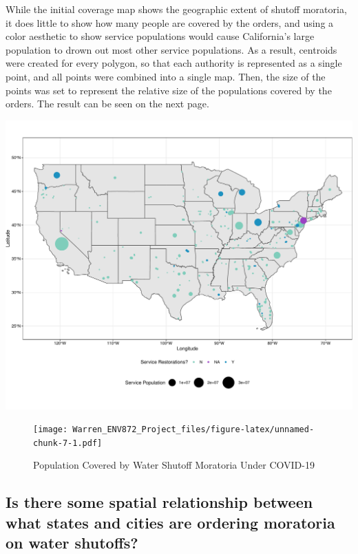 \documentclass[
  12pt,
]{article}
\begin{document}
While the initial coverage map shows the geographic extent of shutoff
moratoria, it does little to show how many people are covered by the
orders, and using a color aesthetic to show service populations would
cause California's large population to drown out most other service
populations. As a result, centroids were created for every polygon, so
that each authority is represented as a single point, and all points
were combined into a single map. Then, the size of the points was set to
represent the relative size of the populations covered by the orders.
The result can be seen on the next page.

\includegraphics{Warren_ENV872_Project_files/figure-latex/unnamed-chunk-6-1.pdf}

\begin{figure}
\centering
\texttt{[image: Warren\_ENV872\_Project\_files/figure-latex/unnamed-chunk-7-1.pdf]}
\caption{Population Covered by Water Shutoff Moratoria Under COVID-19}
\end{figure}

\newpage

\hypertarget{is-there-some-spatial-relationship-between-what-states-and-cities-are-ordering-moratoria-on-water-shutoffs}{%
\subsection{Is there some spatial relationship between what states and
cities are ordering moratoria on water
shutoffs?}\label{is-there-some-spatial-relationship-between-what-states-and-cities-are-ordering-moratoria-on-water-shutoffs}}
\end{document}

